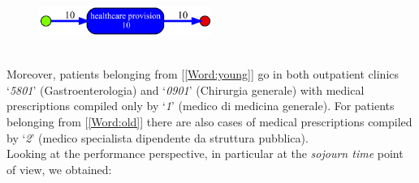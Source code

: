 \begin{figure} [htbp]
\centering
\includegraphics[width=0.5\textwidth]{AmbulatoriInductiveVisualMinerYoungs4301}
\end{figure}\\
Moreover, patients belonging from [\ref{Word:young}] go in both outpatient clinics `\textit{5801}' (Gastroenterologia) and `\textit{0901}' (Chirurgia generale) with medical prescriptions compiled only by `\textit{1}' (medico di medicina generale). For patients belonging from [\ref{Word:old}] there are also cases of medical prescriptions compiled by `\textit{2}' (medico specialista dipendente da struttura pubblica).\\
Looking at the performance perspective, in particular at the \textit{sojourn time} point of view, we obtained:

